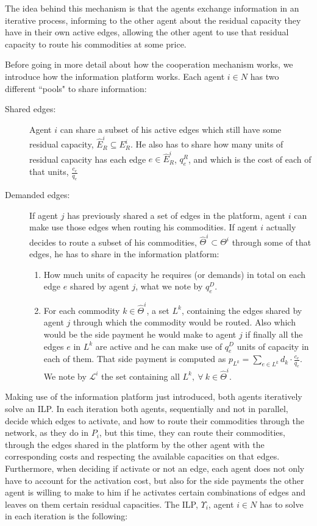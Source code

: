 \documentclass{article}
\begin{document}
The idea behind this mechanism is that the agents exchange information in an iterative process, informing to the other agent about the residual capacity they have in their own active edges, allowing the other agent to use that residual capacity to route his commodities at some price.

Before going in more detail about how the cooperation mechanism works, we introduce how the information platform works. Each agent $i\in N$ has two different ``pools" to share information:

\begin{description}
	\item[Shared edges:] Agent $i$ can share a subset of his active edges which still have some residual capacity, $\widehat{E}_R^i\subseteq E_R^i$. He also has to share how many units of residual capacity has each edge $e\in \widehat{E}_R^i$, $q_e^R$, and which is the cost of each of that units, $\frac{c_e}{q_e}$
	\item[Demanded edges:] If agent $j$ has previously shared a set of edges in the platform, agent $i$ can make use those edges when routing his commodities. If agent $i$ actually decides to route a subset of his commodities, $\widehat{\Theta}^i\subset \Theta ^i$ through some of that edges, he has to share in the information platform:
	\begin{enumerate}
		\item How much units of capacity he requires (or demands) in total on each edge $e$ shared by agent $j$, what we note by $q_e^D$.
	\item For each commodity $k\in \widehat{\Theta}^i$, a set $L^k$, containing the edges shared by agent $j$ through which the commodity would be routed. Also which would be the side payment he would make to agent $j$ if finally all the edges $e$ in $L^k$ are active and he can make use of $q_e^D$ units of capacity in each of them. That side payment is computed as $p_{L^k}=\sum_{e \in L^k} d_k\cdot \frac{c_e}{q_e}$. We note by $\mathcal{L}^i$ the set containing all $L^k,\ \forall\ k \in \widehat{\Theta}^i$.
	\end{enumerate}
		
\end{description}	

Making use of the information platform just introduced, both agents iteratively solve an ILP. In each iteration both agents, sequentially and not in parallel, decide which edges to activate, and how to route their commodities through the network, as they do in $P_i$, but this time, they can route their commodities, through the edges shared in the platform by the other agent with the corresponding costs and respecting the available capacities on that edges. Furthermore, when deciding if activate or not an edge, each agent does not only have to account for the activation cost, but also for the side payments the other agent is willing to make to him if he activates certain combinations of edges and leaves on them certain residual capacities. The ILP, $\Upsilon_i$, agent $i\in N$ has to solve in each iteration is the following:
\end{document}
